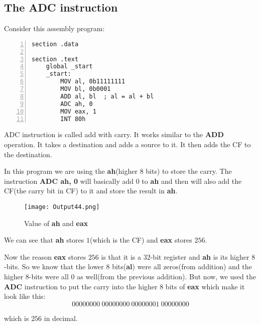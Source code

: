 \documentclass{article}
\makeatletter
\renewcommand\paragraph{\@startsection{paragraph}{4}{\z@}{-3.25ex \@plus -1ex \@minus -.2ex}{1.5ex \@plus .2ex}{\normalfont\normalsize\bfseries}}
\makeatother
\begin{document}
\subsection{The ADC instruction}\label{sec:subsec3}
\paragraph{}
Consider this assembly program:
\begin{Verbatim}[numbers=left, frame=single]
section .data

section .text
	global _start
	_start:
		MOV al, 0b11111111
		MOV bl, 0b0001
		ADD al, bl  ; al = al + bl
		ADC ah, 0
		MOV eax, 1
		INT 80h

\end{Verbatim}
ADC instruction is called add with carry. It works similar to the \textbf{ADD} operation. It takes a destination and adds a source to it. It then adds the CF to the destination.

In this program we are using the \textbf{ah}(higher $8$ bits) to store the carry. The instruction \textbf{ADC ah, 0} will basically add $0$ to \textbf{ah} and then will also add the CF(the carry bit in CF) to it and store the result in \textbf{ah}.

\begin{figure}[h]
\centering
\texttt{[image: Output44.png]}
\caption{Value of \textbf{ah} and \textbf{eax}}
\label{fig:fig11}
\end{figure}

We can see that \textbf{ah} stores $1$(which is the CF) and \textbf{eax} stores $256$.

Now the reason \textbf{eax} stores $256$ is that it is a $32$-bit register and \textbf{ah} is its higher $8$-bits. So we know that the lower $8$ bits(\textbf{al}) were all zeros(from addition) and the higher $8$-bits were all $0$ as well(from the previous addition). But now, we used the \textbf{ADC} instruction to put the carry into the higher $8$ bits of \textbf{eax} which make it look like this:
$$
00000000\ 00000000\ 00000001\ 00000000
$$

which is $256$ in decimal.
\end{document}
